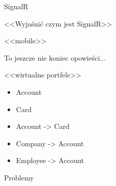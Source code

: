 \documentclass{beamer}
\begin{document}
\begin{frame}{}
	\begin{center}
		\Huge{SignalR}
	\end{center}
\end{frame}

\begin{frame}{}
	\begin{center}
		\Huge{<<Wyjaśnić czym jest SignalR>>}
	\end{center}
\end{frame}

\begin{frame}{}
	\begin{center}
		\Huge{<<mobile>>}
	\end{center}
\end{frame}

\begin{frame}{}
	\begin{center}
		\Huge{To jeszcze nie koniec opowieści...}
	\end{center}
\end{frame}

\begin{frame}{}
	\begin{center}
		\Huge{<<wirtualne portfele>>}
	\end{center}
\end{frame}

\begin{frame}{}
	\begin{huge}
		\begin{itemize}[<+->]
			\item Account
			\item Card
		\end{itemize}
	\end{huge}
\end{frame}

\begin{frame}{}
	\begin{huge}
		\begin{itemize}[<+->]
			\item Account -> Card
			\item Company -> Account
			\item Employee -> Account
		\end{itemize}
	\end{huge}
\end{frame}

\begin{frame}{}
	\begin{center}
		\Huge{Problemy}
	\end{center}
\end{frame}
\end{document}
